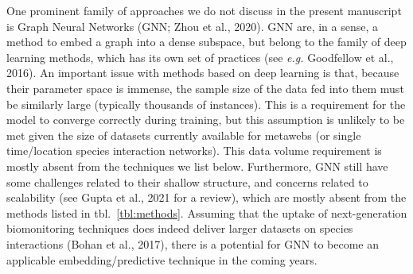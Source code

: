 \documentclass[10pt,oneside]{article}
\begin{document}
One prominent family of approaches we do not discuss in the present
manuscript is Graph Neural Networks (GNN; Zhou et al., 2020). GNN are,
in a sense, a method to embed a graph into a dense subspace, but belong
to the family of deep learning methods, which has its own set of
practices (see \emph{e.g.} Goodfellow et al., 2016). An important issue
with methods based on deep learning is that, because their parameter
space is immense, the sample size of the data fed into them must be
similarly large (typically thousands of instances). This is a
requirement for the model to converge correctly during training, but
this assumption is unlikely to be met given the size of datasets
currently available for metawebs (or single time/location species
interaction networks). This data volume requirement is mostly absent
from the techniques we list below. Furthermore, GNN still have some
challenges related to their shallow structure, and concerns related to
scalability (see Gupta et al., 2021 for a review), which are mostly
absent from the methods listed in tbl.~\ref{tbl:methods}. Assuming that
the uptake of next-generation biomonitoring techniques does indeed
deliver larger datasets on species interactions (Bohan et al., 2017),
there is a potential for GNN to become an applicable
embedding/predictive technique in the coming years.
\end{document}
